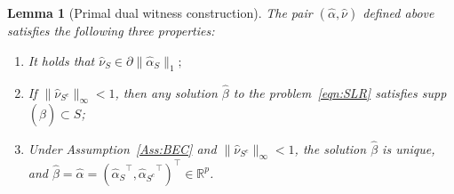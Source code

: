 \documentclass{elsarticle}
\newtheorem{lemma}{Lemma}
\newcommand\norm[1]{\lVert#1\rVert}
\newcommand{\estipara}{{\hat{\beta}}}
\newcommand{\R}{{\mathbb{R}}}
\newcommand{\primal}{{\hat{\alpha}}}
\newcommand{\prims}{{\hat{\alpha}_{S}}}
\newcommand{\primsc}{{\hat{\alpha}_{{S}^c}}}
\newcommand{\dual}{{\hat{\nu}}}
\newcommand{\duals}{{\hat{\nu}_{S}}}
\newcommand{\dualsc}{{\hat{\nu}_{{S}^c}}}
\newcommand{\redef}{=}
\begin{document}
\vspace{3mm}

\begin{lemma}[Primal dual witness construction]\label{lem:PDW}
  The pair $(\primal, \dual)$ defined above satisfies the following three properties:
    \begin{enumerate}
      \item[(i)] It holds that $ \duals\in \partial \norm{\prims}_1;$
      \item[(ii)] If $\norm{\dualsc}_{\infty}<1$, then any solution $\estipara$ to the problem~\eqref{eqn:SLR} satisfies \textnormal{supp}$(\estipara)\subset S$;
      \item[(iii)] Under Assumption~\ref{Ass:BEC} and $\norm{\dualsc}_{\infty}<1$, the solution $\estipara$ is unique, and $\estipara = \primal\redef(\prims^\top,\primsc^\top)^\top\in \R^p$.
    \end{enumerate}
\end{lemma}
\end{document}
